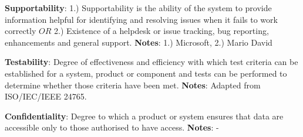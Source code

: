 \textbf{Supportability}: 1.) Supportability is the ability of the system to provide information helpful for identifying and resolving issues when it fails to work correctly $OR$ 2.) Existence of a helpdesk or issue tracking, bug reporting, enhancements and general support. \textbf{Notes}: 1.) Microsoft, 2.) Mario David

\textbf{Testability}: Degree of effectiveness and efficiency with which test criteria can be established for a system, product or component and tests can be performed to determine whether those criteria have been met. \textbf{Notes}: Adapted from ISO/IEC/IEEE 24765.

\textbf{Confidentiality}: Degree to which a product or system ensures that data are accessible only to those authorised to have access. \textbf{Notes}: -

